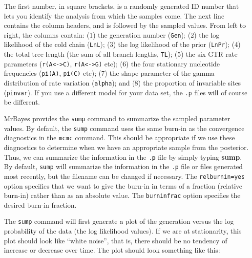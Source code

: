 \documentclass[12pt]{book}
\newcommand{\ttt}[1]{\texttt{#1}}
\begin{document}
The first number, in square brackets, is a randomly generated ID number that lets you identify the
analysis from which the samples come. The next line contains the column headers, and is followed by
the sampled values. From left to right, the columns contain: (1) the generation number (\ttt{Gen});
(2) the log likelihood of the cold chain (\ttt{LnL}); (3) the log likelihood of the prior
(\ttt{LnPr});
(4) the total tree length (the sum of all branch lengths, \ttt{TL}); (5) the six GTR rate
parameters (\ttt{r(A<->C)}, \ttt{r(A<->G)} etc); (6) the four stationary nucleotide frequencies
(\ttt{pi(A)}, \ttt{pi(C)} etc); (7) the shape parameter of the gamma distribution of rate variation
(\ttt{alpha}); and (8) the proportion of invariable sites (\ttt{pinvar}). If you use a different
model for your data set, the \ttt{.p} files will of course be different.

MrBayes provides the \ttt{sump} command to summarize the sampled parameter values. By default, the
\ttt{sump} command uses the same burn-in as the convergence diagnostics in the \ttt{mcmc} command.
This should be appropriate if we use these diagnostics to determine when we have an appropriate
sample from the posterior. Thus, we can summarize the information in the \ttt{.p} file by simply
typing \textbf{sump}. By default, \ttt{sump} will summarize the information in the \ttt{.p} file or
files generated most recently, but the filename can be changed if necessary. The
\ttt{relburnin=yes} option specifies that we want to give the burn-in in terms of a fraction
(relative burn-in) rather than as an absolute value. The \ttt{burninfrac} option specifies the
desired burn-in fraction.

The \ttt{sump} command will first generate a plot of the generation versus the log probability of
the data (the log likelihood values). If we are at stationarity, this plot should look like ``white
noise'', that is, there should be no tendency of increase or decrease over time. The plot should
look something like this:
\end{document}

